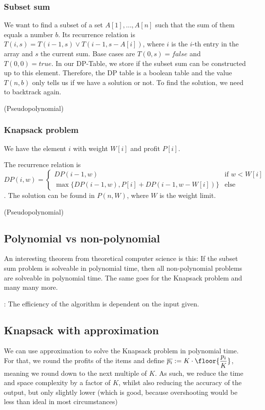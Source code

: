 \subsubsection{Subset sum}
We want to find a subset of a set $A[1], \ldots, A[n]$ such that the sum of them equals a number $b$. Its recurrence relation is $T(i, s) = T(i - 1, s) \lor T(i - 1, s - A[i])$, where $i$ is the $i$-th entry in the array and $s$ the current sum. Base cases are $T(0, s) = false$ and $T(0, 0) = true$. In our DP-Table, we store if the subset sum can be constructed up to this element. Therefore, the DP table is a boolean table and the value $T(n, b)$ only tells us if we have a solution or not. To find the solution, we need to backtrack again.

\timecomplexity {} (Pseudopolynomial)


\subsubsection{Knapsack problem}
We have the element $i$ with weight $W[i]$ and profit $P[i]$. 

The recurrence relation is $DP(i, w) = \begin{cases}
    DP(i - 1, w) & \text{if } w < W[i]\\
    \max\{DP(i - 1, w), P[i] + DP(i - 1, w - W[i])\} & \text{else}
\end{cases}$. The solution can be found in $P(n, W)$, where $W$ is the weight limit.

\timecomplexity {} (Pseudopolynomial)


\newpage
\subsection{Polynomial vs non-polynomial}
An interesting theorem from theoretical computer science is this: If the subset sum problem is solveable in polynomial time, then all non-polynomial problems are solveable in polynomial time. The same goes for the Knapsack problem and many many more.

: The efficiency of the algorithm is dependent on the input given.


\subsection{Knapsack with approximation}
We can use approximation to solve the Knapsack problem in polynomial time. For that, we round the profits of the items and define $\displaystyle \overline{p_i} := K \cdot \floor{\frac{p_i}{K}}$, meaning we round down to the next multiple of $K$. As such, we reduce the time and space complexity by a factor of $K$, whilst also reducing the accuracy of the output, but only slightly lower (which is good, because overshooting would be less than ideal in most circumstances)


